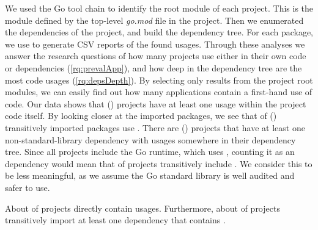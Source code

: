 We used the Go tool chain to identify the root module of each project. 
This is the module defined by the top-level \textit{go.mod} file in the project.
Then we enumerated the dependencies of the project, and build the dependency tree.
For each package, we use \toolUsage{} to generate CSV reports of the found \unsafe{} usages.
Through these analyses we answer the research questions of how many projects use \unsafe{} either in their own code or dependencies (\ref{rq:prevalApp}), and how deep in the dependency tree are the most \unsafe{} code usages (\ref{rq:depsDepth}). 
By selecting only results from the project root modules, we can easily find out how many applications contain a first-hand use of \unsafe{} code.
Our data shows that  () projects have at least one \unsafe{} usage within the project code itself.
By looking closer at the imported packages, we see that  of  () transitively imported packages use \unsafe{}. 
There are  () projects that have at least one non-standard-library dependency with \unsafe{} usages somewhere in their dependency tree.
Since all projects include the Go runtime, which uses \unsafe{}, counting it as an \unsafe{} dependency would mean that  of projects transitively include \unsafe{}.
We consider this to be less meaningful, as we assume the Go standard library is well audited and safer to use.

\begin{tcolorbox}[boxsep=1pt, enlarge top by=5pt, title=Answer to \ref{rq:prevalApp}]
About  of projects directly contain \unsafe{} usages.
Furthermore, about  of projects transitively import at least one dependency that contains \unsafe{}.
\end{tcolorbox}

